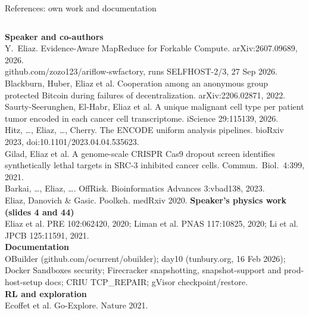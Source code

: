 \begin{frame}[t]{References: own work and documentation}
\vspace{0pt}
{\fontsize{7.0}{8.3}\selectfont
\begin{columns}[T,onlytextwidth]
\textbf{Speaker and co-authors}\\
Y.~Eliaz. Evidence-Aware MapReduce for Forkable Compute. arXiv:2607.09689, 2026.\\
github.com/zozo123/ariflow-swfactory, runs SELFHOST-2/3, 27 Sep 2026.\\
Blackburn, Huber, Eliaz et al. Cooperation among an anonymous group protected Bitcoin during failures of decentralization. arXiv:2206.02871, 2022.\\
Saurty-Seerunghen, El-Habr, Eliaz et al. A unique malignant cell type per patient tumor encoded in each cancer cell transcriptome. iScience 29:115139, 2026.\\
Hitz, \dots, Eliaz, \dots, Cherry. The ENCODE uniform analysis pipelines. bioRxiv 2023, doi:10.1101/2023.04.04.535623.\\
Gilad, Eliaz et al. A genome-scale CRISPR Cas9 dropout screen identifies synthetically lethal targets in SRC-3 inhibited cancer cells. Commun.\ Biol.\ 4:399, 2021.\\
Barkai, \dots, Eliaz, \dots. OffRisk. Bioinformatics Advances 3:vbad138, 2023.\\
Eliaz, Danovich \& Gasic. Poolkeh. medRxiv 2020.
\textbf{Speaker's physics work (slides 4 and 44)}\\
Eliaz et al. PRE 102:062420, 2020; Liman et al. PNAS 117:10825, 2020; Li et al. JPCB 125:11591, 2021.\\[4pt]
\textbf{Documentation}\\
OBuilder (github.com/ocurrent/obuilder); day10 (tunbury.org, 16 Feb 2026); Docker Sandboxes security; Firecracker snapshotting, snapshot-support and prod-host-setup docs; CRIU TCP\_REPAIR; gVisor checkpoint/restore.\\[4pt]
\textbf{RL and exploration}\\
Ecoffet et al. Go-Explore. Nature 2021.
\end{columns}\par}
\end{frame}
